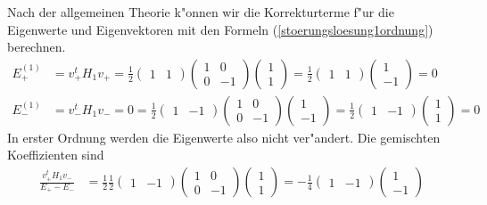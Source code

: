 \begin{loesung}
Nach der allgemeinen Theorie k"onnen wir die Korrekturterme f"ur die
Eigenwerte und Eigenvektoren mit den Formeln (\ref{stoerungsloesung1ordnung})
berechnen.
\begin{align*}
E_+^{(1)}&=v_+^tH_1v_+
	=\frac12\begin{pmatrix}1&1\end{pmatrix}
		\begin{pmatrix}1&0\\0&-1\end{pmatrix}
		\begin{pmatrix}1\\1\end{pmatrix}
	=\frac12\begin{pmatrix}1&1\end{pmatrix}
		\begin{pmatrix}1\\-1\end{pmatrix}
	=0
\\
E_-^{(1)}&=v_-^tH_1v_-=0
	=\frac12\begin{pmatrix}1&-1\end{pmatrix}
		\begin{pmatrix}1&0\\0&-1\end{pmatrix}
		\begin{pmatrix}1\\-1\end{pmatrix}
	=\frac12\begin{pmatrix}1&-1\end{pmatrix}
		\begin{pmatrix}1\\1\end{pmatrix}
	=0
\end{align*}
In erster Ordnung werden die Eigenwerte also nicht ver"andert.
Die gemischten Koeffizienten sind
\begin{align*}
\frac{v_+^tH_1v_-}{E_+-E_-}
&=
\frac{1}{2}
\frac12
	\begin{pmatrix}1&-1\end{pmatrix}
	\begin{pmatrix}1&0\\0&-1\end{pmatrix}
	\begin{pmatrix}1\\1\end{pmatrix}
=
-\frac14
	\begin{pmatrix}1&-1\end{pmatrix}
	\begin{pmatrix}1\\-1\end{pmatrix}

\end{align*}
\end{loesung}

